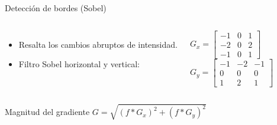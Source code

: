 \documentclass[10pt]{beamer}
\begin{document}
\begin{frame}{Detecci\'on de bordes (Sobel)}
\begin{columns}
\begin{itemize}
  \item Resalta los cambios abruptos de intensidad.
  \item Filtro Sobel horizontal y vertical:
\end{itemize}
\centering
$G_x = \begin{bmatrix}-1 & 0 & 1\\ -2 & 0 & 2\\ -1 & 0 & 1\end{bmatrix}$\\[2mm]
$G_y = \begin{bmatrix}-1 & -2 & -1\\ 0 & 0 & 0\\ 1 & 2 & 1\end{bmatrix}$

\end{columns}
\vspace{2mm}
\begin{block}{Magnitud del gradiente}
\( G = \sqrt{(f*G_x)^2 + (f*G_y)^2} \)
\end{block}
\end{frame}
\end{document}
